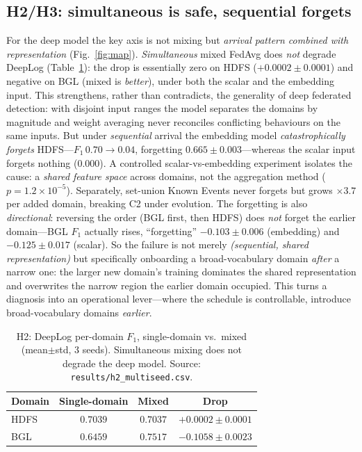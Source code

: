 \documentclass[conference]{IEEEtran}
\begin{document}
\subsection{H2/H3: simultaneous is safe, sequential forgets}
For the deep model the key axis is not mixing but \emph{arrival pattern combined with representation}
(Fig.~\ref{fig:map}). \emph{Simultaneous} mixed FedAvg does \emph{not} degrade DeepLog (Table~\ref{tab:h2}): the drop is
essentially zero on HDFS ($+0.0002\pm0.0001$) and negative on BGL (mixed is \emph{better}), under both
the scalar and the embedding input. This strengthens, rather than contradicts, the generality of deep
federated detection: with disjoint input ranges the model separates the domains by magnitude and weight
averaging never reconciles conflicting behaviours on the same inputs. But under \emph{sequential} arrival the
embedding model \emph{catastrophically forgets} HDFS---$F_1\,0.70\!\rightarrow\!0.04$, forgetting
$0.665\pm0.003$---whereas the scalar input forgets nothing ($0.000$). A controlled scalar-vs-embedding
experiment isolates the cause: a \emph{shared feature space} across domains, not the aggregation
method ($p{=}1.2\times10^{-5}$). Separately, set-union Known Events never forgets but grows
$\times3.7$ per added domain, breaking C2 under evolution. The forgetting is also \emph{directional}: reversing the order (BGL first, then HDFS) does \emph{not}
forget the earlier domain---BGL $F_1$ actually rises, ``forgetting'' $-0.103\pm0.006$ (embedding) and
$-0.125\pm0.017$ (scalar). So the failure is not merely \emph{(sequential, shared representation)} but
specifically onboarding a broad-vocabulary domain \emph{after} a narrow one: the larger new domain's
training dominates the shared representation and overwrites the narrow region the earlier domain
occupied. This turns a diagnosis into an operational lever---where the schedule is controllable,
introduce broad-vocabulary domains \emph{earlier}.

\begin{table}[t]
\caption{H2: DeepLog per-domain $F_1$, single-domain vs.\ mixed (mean$\pm$std, $3$ seeds). Simultaneous
mixing does not degrade the deep model. Source: \texttt{results/h2\_multiseed.csv}.}
\label{tab:h2}
\centering\small
\begin{tabular}{@{}lccc@{}}
\toprule
Domain & Single-domain & Mixed & Drop \\
\midrule
HDFS & $0.7039$ & $0.7037$ & $+0.0002\pm0.0001$ \\
BGL  & $0.6459$ & $0.7517$ & $-0.1058\pm0.0023$ \\
\bottomrule
\end{tabular}
\end{table}
\end{document}
